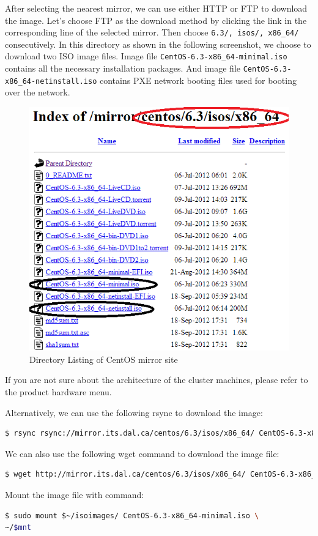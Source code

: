 After selecting the nearest mirror, we can use either HTTP or FTP to download the image. Let's choose FTP as the download method by clicking the link in the corresponding line of the selected mirror. Then choose \verb|6.3/, isos/, x86_64/| consecutively. In this directory as shown in the following screenshot, we choose to download two ISO image files. Image file \verb|CentOS-6.3-x86_64-minimal.iso| contains all the necessary installation packages. And image file \verb|CentOS-6.3-x86_64-netinstall.iso| contains PXE network booting files used for booting over the network.
\begin{figure}[ht]
  \centering
  \includegraphics[width=.6\textwidth]{figs/5163os_02_02.png}
  \caption{Directory Listing of CentOS mirror site}\label{fig:centos.mirror}
\end{figure} 
If you are not sure about the architecture of the cluster machines, please refer to the product hardware menu.

Alternatively, we can use the following rsync to download the image:
\lstset{style=bashstyle}
\begin{lstlisting}[language=bash]
$ rsync rsync://mirror.its.dal.ca/centos/6.3/isos/x86_64/ CentOS-6.3-x86_64-netinstall.iso ~/isoimages
\end{lstlisting}

We can also use the following wget command to download the image file: 
\lstset{style=bashstyle}
\begin{lstlisting}[language=bash]
$ wget http://mirror.its.dal.ca/centos/6.3/isos/x86_64/ CentOS-6.3-x86_64-netinstall.iso -P ~/isoimages
\end{lstlisting}

Mount the image file with command:
\lstset{style=bashstyle}
\begin{lstlisting}[language=bash]
$ sudo mount $~/isoimages/ CentOS-6.3-x86_64-minimal.iso \
~/$mnt
\end{lstlisting}

